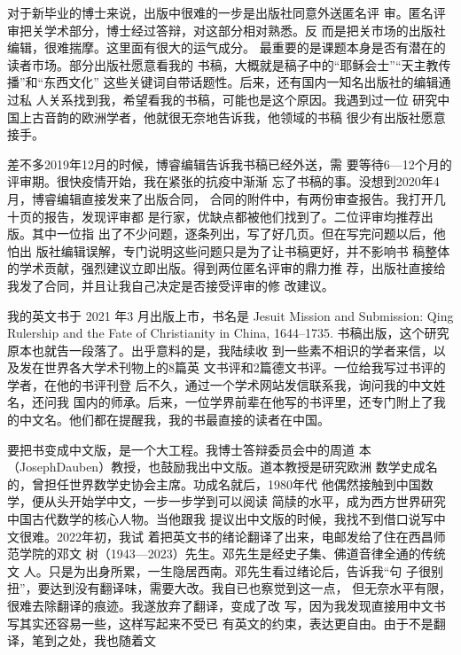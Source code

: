 对于新毕业的博士来说，出版中很难的一步是出版社同意外送匿名评%
审。匿名评审把关学术部分，博士经过答辩，对这部分相对熟悉。反%
而是把关市场的出版社编辑，很难揣摩。这里面有很大的运气成分。%
最重要的是课题本身是否有潜在的读者市场。部分出版社愿意看我的%
书稿，大概就是稿子中的“耶稣会士”“天主教传播”和“东西文化”%
这些关键词自带话题性。后来，还有国内一知名出版社的编辑通过私%
人关系找到我，希望看我的书稿，可能也是这个原因。我遇到过一位%
研究中国上古音韵的欧洲学者，他就很无奈地告诉我，他领域的书稿%
很少有出版社愿意接手。%
\par
差不多2019年12月的时候，博睿编辑告诉我书稿已经外送，需%
要等待6—12个月的评审期。很快疫情开始，我在紧张的抗疫中渐渐%
忘了书稿的事。没想到2020年4月，博睿编辑直接发来了出版合同，%
合同的附件中，有两份审查报告。我打开几十页的报告，发现评审都%
是行家，优缺点都被他们找到了。二位评审均推荐出版。其中一位指%
出了不少问题，逐条列出，写了好几页。但在写完问题以后，他怕出%
版社编辑误解，专门说明这些问题只是为了让书稿更好，并不影响书%
稿整体的学术贡献，强烈建议立即出版。得到两位匿名评审的鼎力推%
荐，出版社直接给我发了合同，并且让我自己决定是否接受评审的修%
改建议。%
\par
我的英文书于 2021 年3 月出版上市，书名是 Jesuit Mission and%
\space%
Submission: Qing Rulership and the Fate of Christianity in China, 1644–1735.%
书稿出版，这个研究原本也就告一段落了。出乎意料的是，我陆续收%
到一些素不相识的学者来信，以及发在世界各大学术刊物上的8篇英%
文书评和2篇德文书评。一位给我写过书评的学者，在他的书评刊登%
后不久，通过一个学术网站发信联系我，询问我的中文姓名，还问我%
国内的师承。后来，一位学界前辈在他写的书评里，还专门附上了我%
的中文名。他们都在提醒我，我的书最直接的读者在中国。%
\par
要把书变成中文版，是一个大工程。我博士答辩委员会中的周道%
本（JosephDauben）教授，也鼓励我出中文版。道本教授是研究欧洲%
数学史成名的，曾担任世界数学史协会主席。功成名就后，1980年代%
他偶然接触到中国数学，便从头开始学中文，一步一步学到可以阅读%
简牍的水平，成为西方世界研究中国古代数学的核心人物。当他跟我%
提议出中文版的时候，我找不到借口说写中文很难。2022年初，我试%
着把英文书的绪论翻译了出来，电邮发给了住在西昌师范学院的邓文%
树（1943—2023）先生。邓先生是经史子集、佛道音律全通的传统文%
人。只是为出身所累，一生隐居西南。邓先生看过绪论后，告诉我“句%
子很别扭”，要达到没有翻译味，需要大改。我自已也察觉到这一点，%
但无奈水平有限，很难去除翻译的痕迹。我遂放弃了翻译，变成了改%
写，因为我发现直接用中文书写其实还容易一些，这样写起来不受已%
有英文的约束，表达更自由。由于不是翻译，笔到之处，我也随着文%
